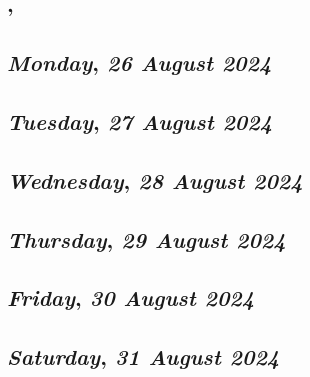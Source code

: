 \subsection*{\weekday, \day}

\def\day{\textit{26 August 2024}}
\def\weekday{\textit{Monday}}
\subsection*{\weekday, \day}

\def\day{\textit{27 August 2024}}
\def\weekday{\textit{Tuesday}}
\subsection*{\weekday, \day}

\def\day{\textit{28 August 2024}}
\def\weekday{\textit{Wednesday}}
\subsection*{\weekday, \day}

\def\day{\textit{29 August 2024}}
\def\weekday{\textit{Thursday}}
\subsection*{\weekday, \day}

\def\day{\textit{30 August 2024}}
\def\weekday{\textit{Friday}}
\subsection*{\weekday, \day}

\def\day{\textit{31 August 2024}}
\def\weekday{\textit{Saturday}}
\subsection*{\weekday, \day}
